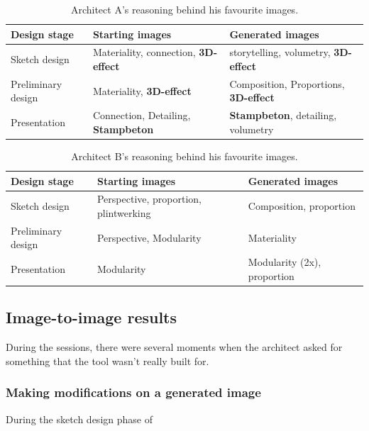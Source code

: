 \begin{table}[H]
    \centering
    \begin{tabular}{l||l|l}
        \textbf{Design stage} & \textbf{Starting images} & \textbf{Generated images}\\
        \hline
        Sketch design & Materiality, connection, \textbf{3D-effect} & storytelling, volumetry, \textbf{3D-effect}\\
        Preliminary design & Materiality, \textbf{3D-effect} & Composition, Proportions, \textbf{3D-effect}\\
        Presentation & Connection, Detailing, \textbf{Stampbeton} & \textbf{Stampbeton}, detailing, volumetry\\
    \end{tabular}
    \caption{Architect A's reasoning behind his favourite images.}
    \label{tab:8-1}
\end{table}

\begin{table}[H]
    \centering
    \begin{tabular}{l||l|l}
        \textbf{Design stage} & \textbf{Starting images} & \textbf{Generated images}\\
        \hline
        Sketch design & Perspective, proportion, plintwerking & Composition, proportion\\
        Preliminary design & Perspective, Modularity & Materiality\\
        Presentation & Modularity & Modularity (2x), proportion\\
    \end{tabular}
    \caption{Architect B's reasoning behind his favourite images.}
    \label{tab:8-2}
\end{table}
\subsection{Image-to-image results}
During the sessions, there were several moments when the architect asked for something that the tool wasn't really built for.
\subsubsection{Making modifications on a generated image}
During the sketch design phase of 

